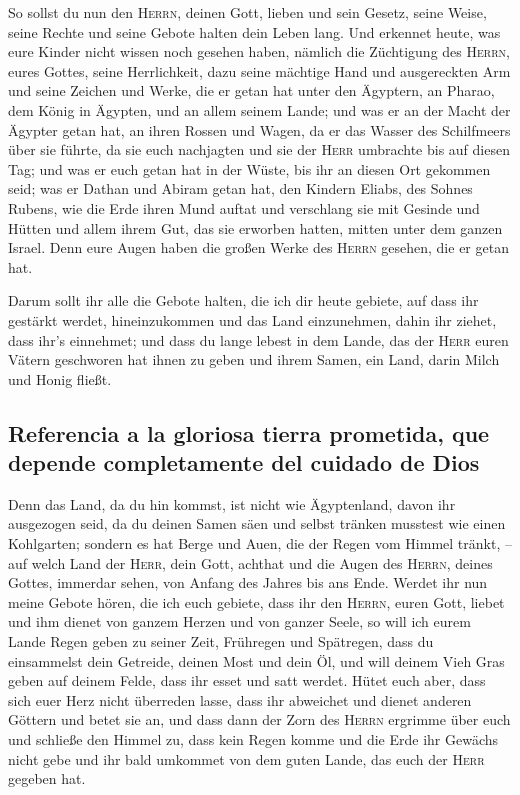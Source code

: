  So sollst du nun den \textsc{Herrn}, deinen Gott, lieben
und sein Gesetz, seine Weise, seine Rechte und seine Gebote halten dein
Leben lang.  Und erkennet heute, was eure Kinder nicht
wissen noch gesehen haben, nämlich die Züchtigung des \textsc{Herrn},
eures Gottes, seine Herrlichkeit, dazu seine mächtige Hand und
ausgereckten Arm  und seine Zeichen und Werke, die er
getan hat unter den Ägyptern, an Pharao, dem König in Ägypten, und an
allem seinem Lande;  und was er an der Macht der Ägypter
getan hat, an ihren Rossen und Wagen, da er das Wasser des Schilfmeers
über sie führte, da sie euch nachjagten und sie der \textsc{Herr}
umbrachte bis auf diesen Tag;  und was er euch getan hat
in der Wüste, bis ihr an diesen Ort gekommen seid;  was er
Dathan und Abiram getan hat, den Kindern Eliabs, des Sohnes Rubens, wie
die Erde ihren Mund auftat und verschlang sie mit Gesinde und Hütten und
allem ihrem Gut, das sie erworben hatten, mitten unter dem ganzen
Israel.  Denn eure Augen haben die großen Werke des
\textsc{Herrn} gesehen, die er getan hat.

 Darum sollt ihr alle die Gebote halten, die ich dir heute
gebiete, auf dass ihr gestärkt werdet, hineinzukommen und das Land
einzunehmen, dahin ihr ziehet, dass ihr's einnehmet;  und
dass du lange lebest in dem Lande, das der \textsc{Herr} euren Vätern
geschworen hat ihnen zu geben und ihrem Samen, ein Land, darin Milch und
Honig fließt.

\hypertarget{referencia-a-la-gloriosa-tierra-prometida-que-depende-completamente-del-cuidado-de-dios}{%
\subsection{Referencia a la gloriosa tierra prometida, que depende
completamente del cuidado de
Dios}\label{referencia-a-la-gloriosa-tierra-prometida-que-depende-completamente-del-cuidado-de-dios}}

 Denn das Land, da du hin kommst, ist nicht wie
Ägyptenland, davon ihr ausgezogen seid, da du deinen Samen säen und
selbst tränken musstest wie einen Kohlgarten;  sondern es
hat Berge und Auen, die der Regen vom Himmel tränkt, -- 
auf welch Land der \textsc{Herr}, dein Gott, achthat und die Augen des
\textsc{Herrn}, deines Gottes, immerdar sehen, von Anfang des Jahres bis
ans Ende.  Werdet ihr nun meine Gebote hören, die ich
euch gebiete, dass ihr den \textsc{Herrn}, euren Gott, liebet und ihm
dienet von ganzem Herzen und von ganzer Seele,  so will
ich eurem Lande Regen geben zu seiner Zeit, Frühregen und Spätregen,
dass du einsammelst dein Getreide, deinen Most und dein Öl,
 und will deinem Vieh Gras geben auf deinem Felde, dass
ihr esset und satt werdet.  Hütet euch aber, dass sich
euer Herz nicht überreden lasse, dass ihr abweichet und dienet anderen
Göttern und betet sie an,  und dass dann der Zorn des
\textsc{Herrn} ergrimme über euch und schließe den Himmel zu, dass kein
Regen komme und die Erde ihr Gewächs nicht gebe und ihr bald umkommet
von dem guten Lande, das euch der \textsc{Herr} gegeben hat.

